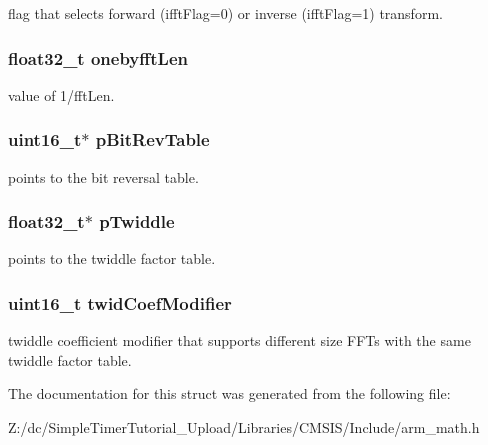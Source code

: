 flag that selects forward (ifft\-Flag=0) or inverse (ifft\-Flag=1) transform. \hypertarget{structarm__cfft__radix4__instance__f32_acf295a7b97b7d48a9cae4d1ab5ed00f6}{
\subsubsection[{onebyfft\-Len}]{\setlength{\rightskip}{0pt plus 5cm}float32\-\_\-t onebyfft\-Len}}\label{structarm__cfft__radix4__instance__f32_acf295a7b97b7d48a9cae4d1ab5ed00f6}
value of 1/fft\-Len. \hypertarget{structarm__cfft__radix4__instance__f32_a46a2fb328199897af100fea0bfdf59aa}{
\subsubsection[{p\-Bit\-Rev\-Table}]{\setlength{\rightskip}{0pt plus 5cm}uint16\-\_\-t$\ast$ p\-Bit\-Rev\-Table}}\label{structarm__cfft__radix4__instance__f32_a46a2fb328199897af100fea0bfdf59aa}
points to the bit reversal table. \hypertarget{structarm__cfft__radix4__instance__f32_aca581481fccdff0f557f54a3ef20d967}{
\subsubsection[{p\-Twiddle}]{\setlength{\rightskip}{0pt plus 5cm}float32\-\_\-t$\ast$ p\-Twiddle}}\label{structarm__cfft__radix4__instance__f32_aca581481fccdff0f557f54a3ef20d967}
points to the twiddle factor table. \hypertarget{structarm__cfft__radix4__instance__f32_afe772e5b5001c9d8e85032115a8df5bf}{
\subsubsection[{twid\-Coef\-Modifier}]{\setlength{\rightskip}{0pt plus 5cm}uint16\-\_\-t twid\-Coef\-Modifier}}\label{structarm__cfft__radix4__instance__f32_afe772e5b5001c9d8e85032115a8df5bf}
twiddle coefficient modifier that supports different size F\-F\-Ts with the same twiddle factor table. 

The documentation for this struct was generated from the following file\-:\begin{DoxyCompactItemize}
\item 
Z\-:/dc/\-Simple\-Timer\-Tutorial\-\_\-\-Upload/\-Libraries/\-C\-M\-S\-I\-S/\-Include/arm\-\_\-math.\-h\end{DoxyCompactItemize}
